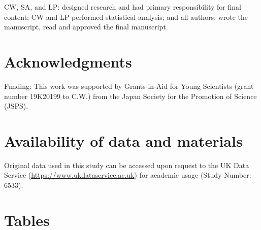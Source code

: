 \documentclass[utf8]{frontiersSCNS}
\begin{document}
CW, SA, and LP: designed research and had primary responsibility for
final content; CW and LP performed statistical analysis; and all
authors: wrote the manuscript, read and approved the final manuscript.

\hypertarget{acknowledgments}{%
\section*{Acknowledgments}\label{acknowledgments}}

Funding: This work was supported by Grants-in-Aid for Young Scientists
(grant number 19K20199 to C.W.) from the Japan Society for the Promotion
of Science (JSPS).

\hypertarget{availability-of-data-and-materials}{%
\section*{Availability of data and
materials}\label{availability-of-data-and-materials}}

Original data used in this study can be accessed upon request to the UK
Data Service (\url{https://www.ukdataservice.ac.uk}) for academic usage
(Study Number: 6533).

\hypertarget{tables}{%
\section*{Tables}\label{tables}}
\end{document}
